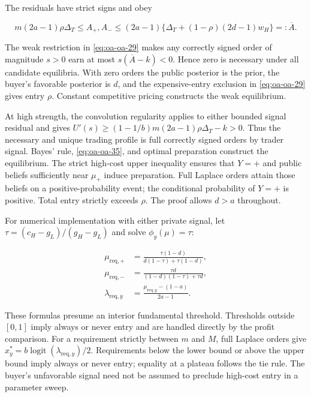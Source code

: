 \documentclass[
  11pt,
]{article}
\begin{document}
The residuals have strict signs and obey

\[
m(2a-1)\rho\Delta_T\le A_+,A_-
\le(2a-1)\{\Delta_T+(1-\rho)(2d-1)w_H\}=: \overline A.
\tag{OA.38}\label{eq:oa-oa-38}
\]

The weak restriction in \eqref{eq:oa-oa-29} makes any correctly signed
order of magnitude \(s>0\) earn at most \(s(\overline A-k)<0\). Hence
zero is necessary under all candidate equilibria. With zero orders the
public posterior is the prior, the buyer's favorable posterior is \(d\),
and the expensive-entry exclusion in \eqref{eq:oa-oa-29} gives entry
\(\rho\). Constant competitive pricing constructs the weak equilibrium.

At high strength, the convolution regularity applies to either bounded
signal residual and gives \(U'(s)\ge(1-1/b)m(2a-1)\rho\Delta_T-k>0\).
Thus the necessary and unique trading profile is full correctly signed
orders by trader signal. Bayes' rule, \eqref{eq:oa-oa-35}, and optimal
preparation construct the equilibrium. The strict high-cost upper
inequality ensures that \(Y=+\) and public beliefs sufficiently near
\(\mu_+\) induce preparation. Full Laplace orders attain those beliefs
on a positive-probability event; the conditional probability of \(Y=+\)
is positive. Total entry strictly exceeds \(\rho\). The proof allows
\(d>a\) throughout.

For numerical implementation with either private signal, let
\(\tau=(c_H-g_L)/(g_H-g_L)\) and solve \(\phi_y(\mu)=\tau\):

\[
\begin{aligned}
\mu_{\mathrm{req},+}&=\frac{\tau(1-d)}{d(1-\tau)+\tau(1-d)},\\
\mu_{\mathrm{req},-}&=\frac{\tau d}{(1-d)(1-\tau)+\tau d},\\
\lambda_{\mathrm{req},y}&=\frac{\mu_{\mathrm{req},y}-(1-a)}{2a-1}.
\end{aligned}
\tag{OA.39}\label{eq:oa-oa-39}
\]

These formulas presume an interior fundamental threshold. Thresholds
outside \([0,1]\) imply always or never entry and are handled directly
by the profit comparison. For a requirement strictly between \(m\) and
\(M\), full Laplace orders give
\(x_y^*=b\operatorname{logit}(\lambda_{\mathrm{req},y})/2\).
Requirements below the lower bound or above the upper bound imply always
or never entry; equality at a plateau follows the tie rule. The buyer's
unfavorable signal need not be assumed to preclude high-cost entry in a
parameter sweep.
\end{document}
